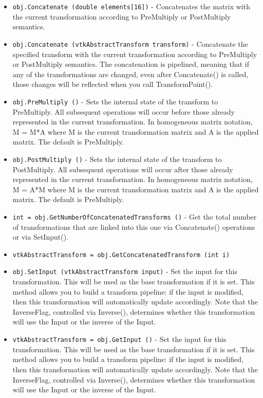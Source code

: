 \begin{itemize}
\item  \verb|obj.Concatenate (double elements[16])| -  Concatenates the matrix with the current transformation according
 to PreMultiply or PostMultiply semantics.

\item  \verb|obj.Concatenate (vtkAbstractTransform transform)| -  Concatenate the specified transform with the current transformation
 according to PreMultiply or PostMultiply semantics.
 The concatenation is pipelined, meaning that if any of the
 transformations are changed, even after Concatenate() is called,
 those changes will be reflected when you call TransformPoint().

\item  \verb|obj.PreMultiply ()| -  Sets the internal state of the transform to PreMultiply. All subsequent
 operations will occur before those already represented in the
 current transformation.  In homogeneous matrix notation, M = M*A where
 M is the current transformation matrix and A is the applied matrix.
 The default is PreMultiply.

\item  \verb|obj.PostMultiply ()| -  Sets the internal state of the transform to PostMultiply. All subsequent
 operations will occur after those already represented in the
 current transformation.  In homogeneous matrix notation, M = A*M where
 M is the current transformation matrix and A is the applied matrix.
 The default is PreMultiply.

\item  \verb|int = obj.GetNumberOfConcatenatedTransforms ()| -  Get the total number of transformations that are linked into this
 one via Concatenate() operations or via SetInput().

\item  \verb|vtkAbstractTransform = obj.GetConcatenatedTransform (int i)|

\item  \verb|obj.SetInput (vtkAbstractTransform input)| -  Set the input for this transformation.  This will be used as the
 base transformation if it is set.  This method allows you to build
 a transform pipeline: if the input is modified, then this transformation
 will automatically update accordingly.  Note that the InverseFlag,
 controlled via Inverse(), determines whether this transformation
 will use the Input or the inverse of the Input.

\item  \verb|vtkAbstractTransform = obj.GetInput ()| -  Set the input for this transformation.  This will be used as the
 base transformation if it is set.  This method allows you to build
 a transform pipeline: if the input is modified, then this transformation
 will automatically update accordingly.  Note that the InverseFlag,
 controlled via Inverse(), determines whether this transformation
 will use the Input or the inverse of the Input.


\end{itemize}
